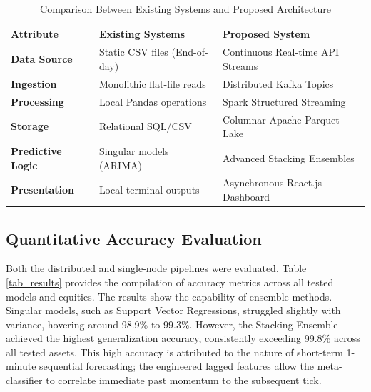 \documentclass[conference]{IEEEtran}
\begin{document}
\begin{table}[htbp]
\caption{Comparison Between Existing Systems and Proposed Architecture}
\begin{center}
\begin{tabular}{|p{2.3cm}|p{2.6cm}|p{2.6cm}|}
\hline
\textbf{Attribute} & \textbf{Existing Systems} & \textbf{Proposed System} \\
\hline
\textbf{Data Source} & Static CSV files (End-of-day) & Continuous Real-time API Streams \\
\textbf{Ingestion} & Monolithic flat-file reads & Distributed Kafka Topics \\
\textbf{Processing} & Local Pandas operations & Spark Structured Streaming \\
\textbf{Storage} & Relational SQL/CSV & Columnar Apache Parquet Lake \\
\textbf{Predictive Logic} & Singular models (ARIMA) & Advanced Stacking Ensembles \\
\textbf{Presentation} & Local terminal outputs & Asynchronous React.js Dashboard \\
\hline
\end{tabular}
\label{tab_system_comparison}
\end{center}
\end{table}

\subsection{Quantitative Accuracy Evaluation}
Both the distributed and single-node pipelines were evaluated. Table \ref{tab_results} provides the compilation of accuracy metrics across all tested models and equities. 
The results show the capability of ensemble methods. Singular models, such as Support Vector Regressions, struggled slightly with variance, hovering around 98.9\% to 99.3\%. However, the Stacking Ensemble achieved the highest generalization accuracy, consistently exceeding 99.8\% across all tested assets. 
This high accuracy is attributed to the nature of short-term 1-minute sequential forecasting; the engineered lagged features allow the meta-classifier to correlate immediate past momentum to the subsequent tick.
\end{document}
